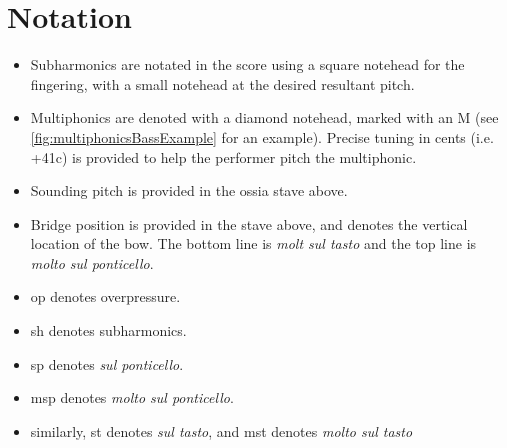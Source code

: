 \section*{Notation}
\begin{itemize}

    \item Subharmonics are notated in the score using a square notehead for the fingering, with a small notehead at the desired resultant pitch.
    \item Multiphonics are denoted with a diamond notehead, marked with an M (see \autoref{fig:multiphonicsBassExample} for an example). Precise tuning in cents (i.e. +41c) is provided to help the performer pitch the multiphonic.
    \item Sounding pitch is provided in the ossia stave above.
    \item Bridge position is provided in the stave above, and denotes the vertical location of the bow. The bottom line is \emph{molt sul tasto} and the top line is \emph{molto sul ponticello}.
    \item op denotes overpressure.
    \item sh denotes subharmonics.
    \item sp denotes \emph{sul ponticello}.
    \item msp denotes \emph{molto sul ponticello}.
    \item similarly, st denotes \emph{sul tasto}, and mst denotes \emph{molto sul tasto}
\end{itemize}

\newpage\label{app:The Veldt Score}

% 

